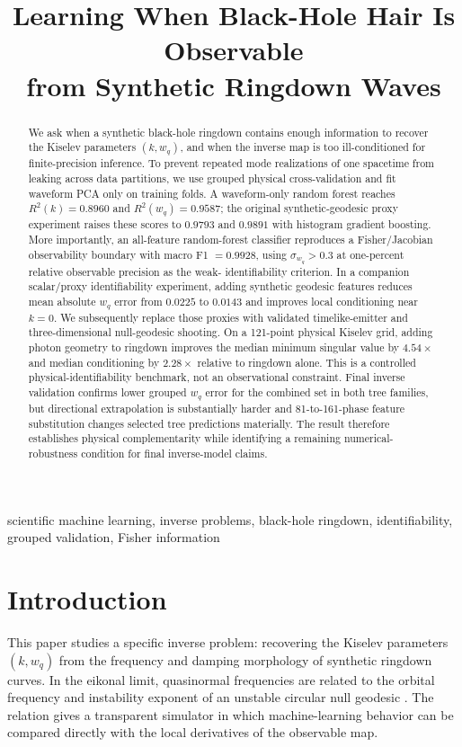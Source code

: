 \documentclass[conference]{IEEEtran}
\title{Learning When Black-Hole Hair Is Observable\\
from Synthetic Ringdown Waves}
\author{
\IEEEauthorblockN{Ariadna Uxue Palomino Ylla}
\IEEEauthorblockA{Nagoya University\\
Nagoya, Japan\\
ariadnaepy@gmail.com}
}
\newcommand{\wq}{w_q}
\newcommand{\sigw}{\sigma_{w_q}}
\begin{document}
\maketitle

\begin{abstract}
We ask when a synthetic black-hole ringdown contains enough information to
recover the Kiselev parameters $(k,\wq)$, and when the inverse map is too
ill-conditioned for finite-precision inference. To prevent repeated mode
realizations of one spacetime from leaking across data partitions, we use
grouped physical cross-validation and fit waveform PCA only on training folds.
A waveform-only random forest reaches $R^2(k)=0.8960$ and
$R^2(\wq)=0.9587$; the original synthetic-geodesic proxy experiment raises these scores to
$0.9793$ and $0.9891$ with histogram gradient boosting. More importantly, an
all-feature random-forest classifier reproduces a Fisher/Jacobian
observability boundary with macro F1 $=0.9928$, using
$\sigw>0.3$ at one-percent relative observable precision as the weak-
identifiability criterion. In a companion scalar/proxy identifiability
experiment, adding synthetic geodesic features reduces mean absolute $\wq$
error from $0.0225$ to $0.0143$ and improves local conditioning near $k=0$.
We subsequently replace those proxies with validated timelike-emitter and
three-dimensional null-geodesic shooting. On a 121-point physical Kiselev
grid, adding photon geometry to ringdown improves the median minimum singular
value by $4.54\times$ and median conditioning by $2.28\times$ relative to
ringdown alone. This is a controlled physical-identifiability benchmark, not
an observational constraint. Final inverse validation confirms lower grouped
$w_q$ error for the combined set in both tree families, but directional
extrapolation is substantially harder and 81-to-161-phase feature substitution
changes selected tree predictions materially. The result therefore establishes
physical complementarity while identifying a remaining numerical-robustness
condition for final inverse-model claims.
\end{abstract}

\begin{IEEEkeywords}
scientific machine learning, inverse problems, black-hole ringdown,
identifiability, grouped validation, Fisher information
\end{IEEEkeywords}

\section{Introduction}
This paper studies a specific inverse problem: recovering the Kiselev
parameters $(k,\wq)$ from the frequency and damping morphology of synthetic
ringdown curves. In the eikonal limit, quasinormal frequencies are related to
the orbital frequency and instability exponent of an unstable circular null
geodesic \cite{cardoso2009geodesic,palominoylla2026ringdown}. The relation gives a transparent
simulator in which machine-learning behavior can be compared directly with the
local derivatives of the observable map.
\end{document}
